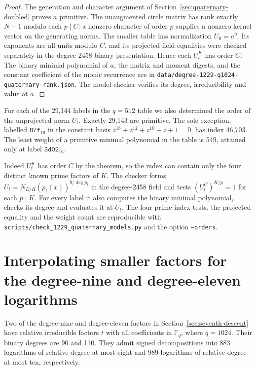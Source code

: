 \documentclass[11pt]{article}
\begin{document}
\begin{proof}
The generation and character argument of
Section~\ref{sec:quaternary-doubled} proves \(a\) primitive. The
unaugmented circle matrix has rank exactly \(N-1\) modulo each
\(p\mid C\): a nonzero character of order \(p\) supplies a nonzero
kernel vector on the generating norms. The smaller table has
normalization \(U_0=a^9\). Its exponents are all units modulo \(C\),
and its projected field equalities were checked separately in the
degree-2458 binary presentation. Hence each \(U_t^K\) has order \(C\).
The binary minimal polynomial of \(a\), the matrix and moment
digests, and the constant coefficient of the monic recurrence are in
\nolinkurl{data/degree-1229-q1024-quaternary-rank.json}. The model
checker verifies its degree, irreducibility and value at \(a\).
\end{proof}

For each of the 29,144 labels in the \(q=512\) table we also determined
the order of the unprojected norm \(U_t\). Exactly 29,143 are primitive.
The sole exception, labelled \(\mathtt{87f}_{16}\) in the constant
basis \(z^{18}+z^{12}+z^{10}+z+1=0\), has index 46,703. The
least weight of a primitive minimal polynomial in the table is 549,
attained only at label \(\mathtt{3d02}_{16}\).

Indeed \(U_t^K\) has order \(C\) by the theorem, so the index can
contain only the four distinct known prime factors of \(K\). The
checker forms \(U_t=N_{E/H}(p_t(x))^{9/\deg p_t}\) in the degree-2458
field and tests \((U_t^C)^{K/p}=1\) for each \(p\mid K\). For every
label it also computes the binary minimal polynomial, checks its
degree and evaluates it at \(U_t\). The four prime-index tests,
the projected equality and the weight count are reproducible with
\nolinkurl{scripts/check_1229_quaternary_models.py} and the
option \texttt{--orders}.

\section{Interpolating smaller factors for the degree-nine and degree-eleven logarithms}
\label{sec:real-pencil-interpolation}
Two of the degree-nine and degree-eleven factors in
Section~\ref{sec:seventh-descent} have relative irreducible factors
\(t\) with all coefficients in \(\mathbb F_q\), where \(q=1024\).
Their binary degrees are 90 and 110. They admit signed decompositions
into 883 logarithms of relative degree at most eight and 989
logarithms of relative degree at most ten, respectively.
\end{document}
